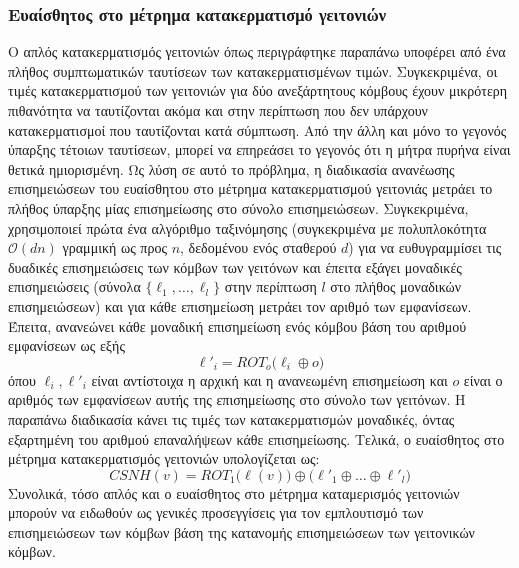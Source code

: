 \subsubsection{Ευαίσθητος στο μέτρημα κατακερματισμό γειτονιών}
Ο απλός κατακερματισμός γειτονιών όπως περιγράφτηκε παραπάνω υποφέρει από ένα πλήθος συμπτωματικών ταυτίσεων των κατακερματισμένων τιμών.
Συγκεκριμένα, οι τιμές κατακερματισμού των γειτονιών για δύο ανεξάρτητους κόμβους έχουν μικρότερη πιθανότητα να ταυτίζονται ακόμα και στην περίπτωση που δεν υπάρχουν κατακερματισμοί που ταυτίζονται κατά σύμπτωση. Από την άλλη και μόνο το γεγονός ύπαρξης τέτοιων ταυτίσεων, μπορεί να επηρεάσει το γεγονός ότι η μήτρα πυρήνα είναι θετικά ημιορισμένη.
Ως λύση σε αυτό το πρόβλημα, η διαδικασία ανανέωσης επισημειώσεων του ευαίσθητου στο μέτρημα κατακερματισμού γειτονιάς μετράει το πλήθος ύπαρξης μίας επισημείωσης στο σύνολο επισημειώσεων.
Συγκεκριμένα, χρησιμοποιεί πρώτα ένα αλγόριθμο ταξινόμησης (συγκεκριμένα  με πολυπλοκότητα $\mathcal{O}(d n)$ γραμμική ως προς $n$, δεδομένου ενός σταθερού $d$) για να ευθυγραμμίσει τις δυαδικές επισημειώσεις των κόμβων των γειτόνων και έπειτα εξάγει μοναδικές επισημειώσεις (σύνολα $\{ \ell_1, \ldots, \ell_l \}$ στην περίπτωση $l$ στο πλήθος μοναδικών επισημειώσεων) και για κάθε επισημείωση μετράει τον αριθμό των εμφανίσεων.
Έπειτα, ανανεώνει κάθε μοναδική επισημείωση ενός κόμβου βάση του αριθμού εμφανίσεων ως εξής
\begin{equation}
    \ell'_i = ROT_o \big( \ell_i \oplus o \big)
\end{equation}
όπου $\ell_i, \ell'_i$ είναι αντίστοιχα η αρχική και η ανανεωμένη επισημείωση και $o$ είναι ο αριθμός των εμφανίσεων αυτής της επισημείωσης στο σύνολο των γειτόνων.
Η παραπάνω διαδικασία κάνει τις τιμές των κατακερματισμών μοναδικές, όντας εξαρτημένη του αριθμού επαναλήψεων κάθε επισημείωσης.
Τελικά, ο ευαίσθητος στο μέτρημα κατακερματισμός γειτονιών υπολογίζεται ως:
\begin{equation}
    CSNH(v) = ROT_1 \big( \ell(v) \big) \oplus \big( \ell'_1 \oplus \ldots \oplus \ell'_l \big)
\end{equation}
Συνολικά, τόσο απλός και ο ευαίσθητος στο μέτρημα καταμερισμός γειτονιών μπορούν να ειδωθούν ως γενικές προσεγγίσεις για τον εμπλουτισμό των επισημειώσεων των κόμβων βάση της κατανομής επισημειώσεων των γειτονικών κόμβων.

